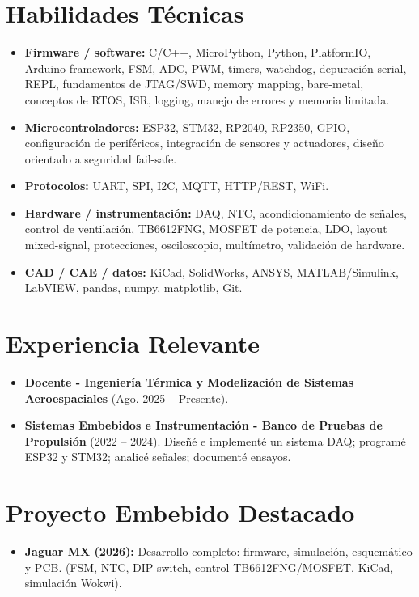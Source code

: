 \documentclass[10pt,a4paper]{article}
\begin{document}
\section*{Habilidades Técnicas}
\begin{itemize}[leftmargin=*, noitemsep]
    \item \textbf{Firmware / software:} C/C++, MicroPython, Python, PlatformIO, Arduino framework, FSM, ADC, PWM, timers, watchdog, depuración serial, REPL, fundamentos de JTAG/SWD, memory mapping, bare-metal, conceptos de RTOS, ISR, logging, manejo de errores y memoria limitada.
    \item \textbf{Microcontroladores:} ESP32, STM32, RP2040, RP2350, GPIO, configuración de periféricos, integración de sensores y actuadores, diseño orientado a seguridad fail-safe.
    \item \textbf{Protocolos:} UART, SPI, I2C, MQTT, HTTP/REST, WiFi.
    \item \textbf{Hardware / instrumentación:} DAQ, NTC, acondicionamiento de señales, control de ventilación, TB6612FNG, MOSFET de potencia, LDO, layout mixed-signal, protecciones, osciloscopio, multímetro, validación de hardware.
    \item \textbf{CAD / CAE / datos:} KiCad, SolidWorks, ANSYS, MATLAB/Simulink, LabVIEW, pandas, numpy, matplotlib, Git.
\end{itemize}

\section*{Experiencia Relevante}
\begin{itemize}[leftmargin=*, noitemsep]
    \item \textbf{Docente - Ingeniería Térmica y Modelización de Sistemas Aeroespaciales} (Ago. 2025 -- Presente).
    \item \textbf{Sistemas Embebidos e Instrumentación - Banco de Pruebas de Propulsión} (2022 -- 2024). Diseñé e implementé un sistema DAQ; programé ESP32 y STM32; analicé señales; documenté ensayos.
\end{itemize}

\section*{Proyecto Embebido Destacado}
\begin{itemize}[leftmargin=*, noitemsep]
    \item \textbf{Jaguar MX (2026):} Desarrollo completo: firmware, simulación, esquemático y PCB. (FSM, NTC, DIP switch, control TB6612FNG/MOSFET, KiCad, simulación Wokwi).
\end{itemize}
\end{document}

